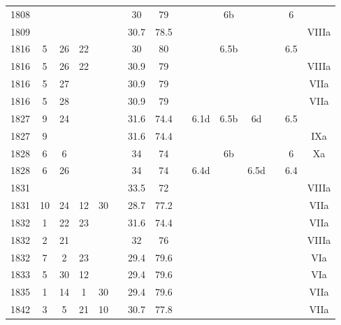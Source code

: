 \begin{flushleft}
\begin{longtable}{|c|c|c|c|c|c|c|c|c|c|c|c|c|c|c|}
1808 &    &    &    &    &    & 30      & 79      &      &       & 6b   &       &      & 6    &        \\
1809 &    &    &    &    &    & 30.7    & 78.5    &      &       &      &       &      &      & VIIIa  \\
1816 & 5  & 26 & 22 &    &    & 30      & 80      &      &       & 6.5b &       &      & 6.5  &        \\
1816 & 5  & 26 & 22 &    &    & 30.9    & 79      &      &       &      &       &      &      & VIIIa  \\
1816 & 5  & 27 &    &    &    & 30.9    & 79      &      &       &      &       &      &      & VIIa   \\
1816 & 5  & 28 &    &    &    & 30.9    & 79      &      &       &      &       &      &      & VIIa   \\
1827 & 9  & 24 &    &    &    & 31.6    & 74.4    &      & 6.1d  & 6.5b & 6d    &      & 6.5  &        \\
1827 & 9  &    &    &    &    & 31.6    & 74.4    &      &       &      &       &      &      & IXa    \\
1828 & 6  & 6  &    &    &    & 34      & 74      &      &       & 6b   &       &      & 6    & Xa     \\
1828 & 6  & 26 &    &    &    & 34      & 74      &      & 6.4d  &      & 6.5d  &      & 6.4  &        \\
1831 &    &    &    &    &    & 33.5    & 72      &      &       &      &       &      &      & VIIIa  \\
1831 & 10 & 24 & 12 & 30 &    & 28.7    & 77.2    &      &       &      &       &      &      & VIIa   \\
1832 & 1  & 22 & 23 &    &    & 31.6    & 74.4    &      &       &      &       &      &      & VIIa   \\
1832 & 2  & 21 &    &    &    & 32      & 76      &      &       &      &       &      &      & VIIIa  \\
1832 & 7  & 2  & 23 &    &    & 29.4    & 79.6    &      &       &      &       &      &      & VIa    \\
1833 & 5  & 30 & 12 &    &    & 29.4    & 79.6    &      &       &      &       &      &      & VIa    \\
1835 & 1  & 14 & 1  & 30 &    & 29.4    & 79.6    &      &       &      &       &      &      & VIIa   \\
1842 & 3  & 5  & 21 & 10 &    & 30.7    & 77.8    &      &       &      &       &      &      & VIIa   \\

\end{longtable}
\end{flushleft}
